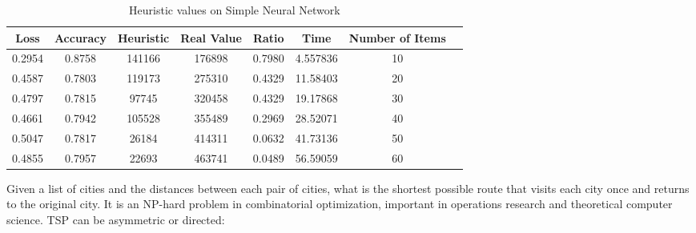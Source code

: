 \documentclass{iitthesis}
\begin{document}

\begin{table}[ht]
\caption{Heuristic values on Simple Neural Network}   %
\centering                          %
\begin{tabular}{c c c c c c c c}            %
\hline\hline                        %

Loss& Accuracy &  Heuristic &Real Value &Ratio &Time & Number of Items \\ [0.3ex] %
\hline                              %
0.2954&0.8758&141166&176898&0.7980&4.557836&10 \\

0.4587&0.7803&119173&275310&0.4329&11.58403&20\\
0.4797&0.7815&97745&320458&0.4329&19.17868&30\\

0.4661&0.7942&105528&355489&0.2969&28.52071&40\\

0.5047&0.7817&26184&414311&0.0632&41.73136&50\\

0.4855&0.7957&22693&463741&0.0489&56.59059&60\\ [1ex]         %
\hline                              %
\end{tabular}
\label{table:nonlin}                %
\end{table}


\newpage
{}
Given a list of cities and the distances between each pair of cities, what is the shortest possible route that visits each city once and returns to the original city. It is an NP-hard problem in combinatorial optimization, important in operations research and theoretical computer science. TSP can be asymmetric or directed:
\end{document}

